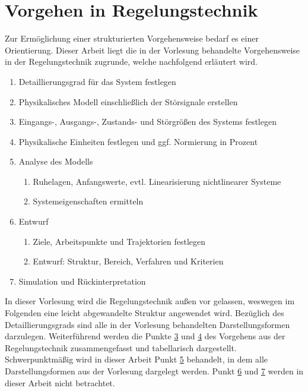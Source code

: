 \section{Vorgehen in Regelungstechnik}
Zur Ermöglichung einer strukturierten Vorgehensweise bedarf es einer Orientierung. Dieser Arbeit liegt die in der Vorlesung behandelte Vorgehensweise in der Regelungstechnik zugrunde, welche nachfolgend erläutert wird.

\begin{enumerate}
    \item Detaillierungsgrad für das System festlegen
    \item Physikalisches Modell einschließlich der Störsignale erstellen
    \item Eingangs-, Ausgangs-, Zustands- und Störgrößen des Systems festlegen
    \label{Punkt3}
    \item Physikalische Einheiten festlegen und ggf. Normierung in Prozent
    \label{Punkt4}
    \item Analyse des Modells
    \label{Punkt5}
    \begin{enumerate}
        \item Ruhelagen, Anfangswerte, evtl. Linearisierung nichtlinearer Systeme
        \item Systemeigenschaften ermitteln
    \end{enumerate}
    \item Entwurf
    \label{Punkt6}
    \begin{enumerate}
        \item Ziele, Arbeitspunkte und Trajektorien festlegen
        \item Entwurf: Struktur, Bereich, Verfahren und Kriterien
    \end{enumerate}
    \item Simulation und Rückinterpretation
    \label{Punkt7}
\end{enumerate}

In dieser Vorlesung wird die Regelungstechnik außen vor gelassen, weswegen im Folgenden eine leicht abgewandelte Struktur angewendet wird. Bezüglich des Detaillierungsgrads sind alle in der Vorlesung behandelten Darstellungsformen darzulegen. Weiterführend werden die Punkte \hyperref[Punkt3]{3} und \hyperref[Punkt4]{4} des Vorgehens aus der Regelungstechnik zusammengefasst und tabellarisch dargestellt. Schwerpunktmäßig wird in dieser Arbeit Punkt \hyperref[Punkt5]{5} behandelt, in dem alle Darstellungsformen aus der Vorlesung dargelegt werden. Punkt \hyperref[Punkt6]{6} und \hyperref[Punkt7]{7} werden in dieser Arbeit nicht betrachtet.

